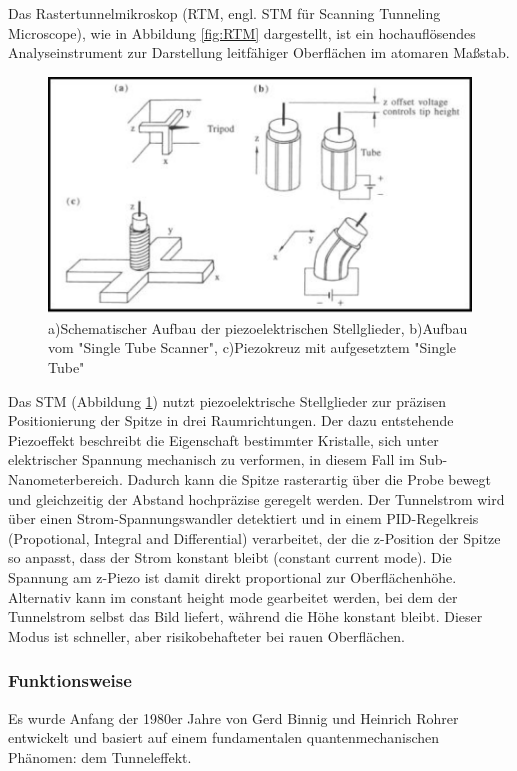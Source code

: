 Das Rastertunnelmikroskop (RTM, engl. STM für Scanning Tunneling Microscope), wie in Abbildung \ref{fig:RTM} dargestellt, ist ein hochauflösendes Analyseinstrument zur Darstellung leitfähiger Oberflächen im atomaren Maßstab.
\begin{figure}[H]
\centering
\includegraphics[width=\linewidth]{figs/RTM piezo}
\caption{a)Schematischer Aufbau der piezoelektrischen Stellglieder, b)Aufbau vom "Single Tube Scanner", c)Piezokreuz mit aufgesetztem "Single Tube" \cite{piezo}}
\label{fig:piezo}
\end{figure}
Das STM (Abbildung \ref{fig:piezo}) nutzt piezoelektrische Stellglieder zur präzisen Positionierung der Spitze in drei Raumrichtungen. Der dazu entstehende Piezoeffekt beschreibt die Eigenschaft bestimmter Kristalle, sich unter elektrischer Spannung mechanisch zu verformen, in diesem Fall im Sub-Nanometerbereich. Dadurch kann die Spitze rasterartig über die Probe bewegt und gleichzeitig der Abstand hochpräzise geregelt werden. Der Tunnelstrom wird über einen Strom-Spannungswandler detektiert und in einem PID-Regelkreis (Propotional, Integral and Differential) verarbeitet, der die z-Position der Spitze so anpasst, dass der Strom konstant bleibt (constant current mode). Die Spannung am z-Piezo ist damit direkt proportional zur Oberflächenhöhe. Alternativ kann im constant height mode gearbeitet werden, bei dem der Tunnelstrom selbst das Bild liefert, während die Höhe konstant bleibt. Dieser Modus ist schneller, aber risikobehafteter bei rauen Oberflächen.


\subsubsection{Funktionsweise}
Es wurde Anfang der 1980er Jahre von Gerd Binnig und Heinrich Rohrer entwickelt und basiert auf einem fundamentalen quantenmechanischen Phänomen: dem Tunneleffekt.

